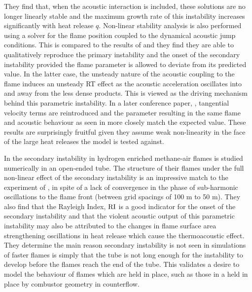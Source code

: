 They find that, when the acoustic interaction is included, these solutions are no longer linearly stable and the maximum growth rate of this instability increases significantly with heat release $q$. Non-linear stability analysis is also performed using a solver for the flame position coupled to the dynamical acoustic jump conditions. This is compared to the results of \cite{searby1992AcousticInstabilityPremixed} and they find they are able to qualitatively reproduce the primary instability and the onset of the secondary instability provided the flame parameter is allowed to deviate from its predicted value. In the latter case, the unsteady nature of the acoustic coupling to the flame induces an unsteady RT effect as the acoustic acceleration oscillates into and away from the less dense products. This is viewed as the driving mechanism behind this parametric instability. In a later conference paper, \cite{assier2014CombustionInstabilityModel}, tangential velocity terms are reintroduced and the parameter resulting in the same flame and acoustic behaviour as seen in \cite{searby1992AcousticInstabilityPremixed} more closely match the expected value. These results are surprisingly fruitful given they assume weak non-linearity in the face of the large heat releases the model is tested against.

In \cite{jun2023ParametricInstabilityPropagating} the secondary instability in hydrogen enriched methane-air flames is studied numerically in an open-ended tube. The structure of their flames under the full non-linear effect of the secondary instability is an impressive match to the experiment of \cite{ebieto2017DynamicsPremixedFlames}, in spite of a lack of convergence in the phase of sub-harmonic oscillations to the flame front (between grid spacings of 100 {\textmu}m to 50 {\textmu}m). They also find that the Rayleigh Index, $\rm{RI}$ is a good indicator for the onset of the secondary instability and that the violent acoustic output of this parametric instability may also be attributed to the changes in flame surface area strengthening oscillations in heat release which cause the thermoacoustic effect. They determine the main reason secondary instability is not seen in simulations of faster flames is simply that the tube is not long enough for the instability to develop before the flames reach the end of the tube. This validates a desire to model the behaviour of flames which are held in place, such as those in a held in place by combustor geometry in counterflow.







